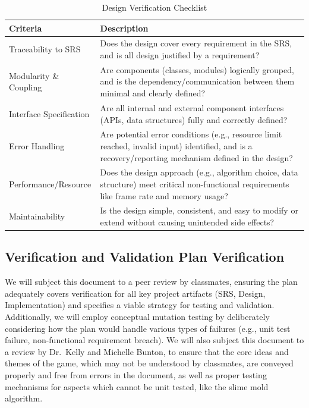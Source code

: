 \documentclass[12pt, titlepage]{article}
\begin{document}
\begin{table}[H]
\caption{Design Verification Checklist}
\begin{tabular}{|p{4cm}|p{11cm}|}
\hline
\textbf{Criteria} & \textbf{Description}                                                                                                                                                                \\ \hline
Traceability to SRS      & Does the design cover every requirement in the SRS, and is all design justified by a requirement?
 \\ \hline
Modularity \& Coupling       & Are components (classes, modules) logically grouped, and is the dependency/communication between them minimal and clearly defined?
\\ \hline
Interface Specification &Are all internal and external component interfaces (APIs, data structures) fully and correctly defined?
\\ \hline
Error Handling       & Are potential error conditions (e.g., resource limit reached, invalid input) identified, and is a recovery/reporting mechanism defined in the design?
\\ \hline
Performance/Resource     & Does the design approach (e.g., algorithm choice, data structure) meet critical non-functional requirements like frame rate and memory usage? 
\\ \hline
Maintainability       & Is the design simple, consistent, and easy to modify or extend without causing unintended side effects?                                                                                                 \\ \hline
\end{tabular}
\end{table}

\subsection{Verification and Validation Plan Verification}

We will subject this document to a peer review by classmates, ensuring the plan adequately
covers verification for all key project artifacts (SRS, Design, Implementation) and specifies
a viable strategy for testing and validation. Additionally, we will employ conceptual
mutation testing by deliberately considering how the plan would handle various types of failures
(e.g., unit test failure, non-functional requirement breach). We will
also subject this document to a review by Dr.\ Kelly and Michelle Bunton, to ensure that the core
ideas and themes of the game, which may not be understood by classmates, are conveyed
properly and free from errors in the document, as well as proper testing mechanisms for
aspects which cannot be unit tested, like the slime mold algorithm.
\end{document}
